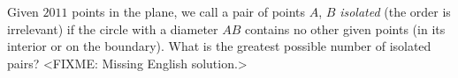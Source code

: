 \problem
Given $2011$ points in the plane, we call a pair of points $A$, $B$
\emph{isolated} (the order is irrelevant) if the circle with a diameter $AB$
contains no other given points (in its interior or on the boundary).
What is the greatest possible number of isolated pairs?
\solution
<FIXME: Missing English solution.>
\endproblem
